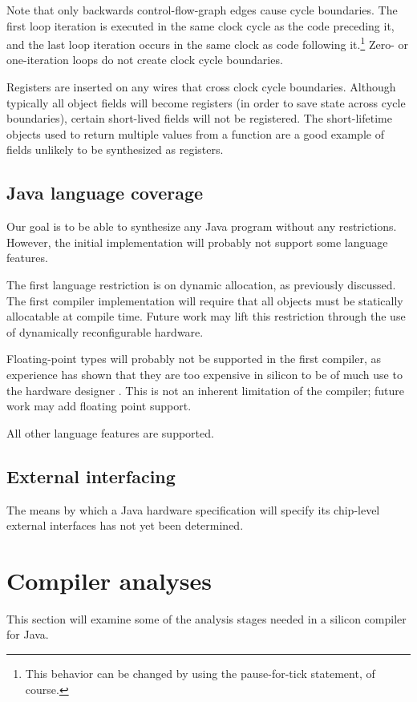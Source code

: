 \documentclass[11pt,notitlepage,twocolumn]{article}
\begin{document}
Note that only backwards control-flow-graph edges cause cycle
boundaries.  The first loop iteration is executed in the same clock
cycle as the code preceding it, and the last loop iteration occurs in
the same clock as code following it.\footnote{This behavior can be
changed by using the pause-for-tick statement, of course.}
Zero- or one-iteration loops do not create clock cycle boundaries.

Registers are inserted on any wires that cross clock cycle
boundaries.  Although typically all object fields will become
registers (in order to save state across cycle
boundaries), certain short-lived fields will not be registered.  The
short-lifetime objects used to return multiple values from a function
are a good example of fields unlikely to be synthesized as registers.

\subsection{Java language coverage}
Our goal is to be able to synthesize any Java program without any
restrictions.  However, the initial implementation will probably not
support some language features.

The first language restriction is on dynamic allocation, as
previously discussed.  The first compiler implementation will require
that all objects must be statically allocatable at compile time.
Future work may lift this restriction through the use of dynamically
reconfigurable hardware.

Floating-point types will probably not be supported in the first
compiler, as experience has shown that they are too expensive in silicon
to be of much use to the hardware designer \cite{shirazi95:float}.  
This is not an inherent limitation of the compiler; future work may
add floating point support.

All other language features are supported.

\subsection{External interfacing}

The means by which a Java hardware specification will specify its
chip-level external interfaces has not yet been determined.

\section{Compiler analyses}
This section will examine some of the analysis stages needed in a
silicon compiler for Java.
\end{document}
